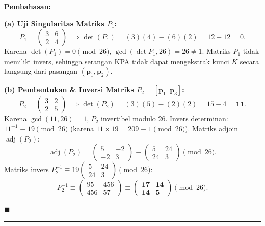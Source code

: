 \documentclass[11pt,a4paper]{article}
\newenvironment{solusi}{\noindent\textbf{\textsf{Pembahasan:}}\par\vspace{0.2em}}{\hfill$\blacksquare$\vspace{1em}\par\hrule\vspace{1em}}
\begin{document}
\begin{solusi}
\textbf{(a) Uji Singularitas Matriks $P_1$:}
\[
P_1 = \begin{pmatrix} 3 & 6 \\ 2 & 4 \end{pmatrix} \implies \det(P_1) = (3)(4) - (6)(2) = 12 - 12 = 0.
\]
Karena $\det(P_1) = 0 \pmod{26}$, $\gcd(\det P_1, 26) = 26 \ne 1$. Matriks $P_1$ tidak memiliki invers, sehingga serangan KPA tidak dapat mengekstrak kunci $K$ secara langsung dari pasangan $(\mathbf{p}_1, \mathbf{p}_2)$.

\vspace{0.2cm}
\textbf{(b) Pembentukan \& Inversi Matriks $P_2 = [\mathbf{p}_1 \;\; \mathbf{p}_3]$:}
\[
P_2 = \begin{pmatrix} 3 & 2 \\ 2 & 5 \end{pmatrix} \implies \det(P_2) = (3)(5) - (2)(2) = 15 - 4 = \mathbf{11}.
\]
Karena $\gcd(11, 26) = 1$, $P_2$ invertibel modulo 26.
Invers determinan: $11^{-1} \equiv 19 \pmod{26}$ (karena $11 \times 19 = 209 \equiv 1 \pmod{26}$).
Matriks adjoin $\operatorname{adj}(P_2)$:
\[
\operatorname{adj}(P_2) = \begin{pmatrix} 5 & -2 \\ -2 & 3 \end{pmatrix} \equiv \begin{pmatrix} 5 & 24 \\ 24 & 3 \end{pmatrix} \pmod{26}.
\]
Matriks invers $P_2^{-1} \equiv 19 \begin{pmatrix} 5 & 24 \\ 24 & 3 \end{pmatrix} \pmod{26}$:
\[
P_2^{-1} \equiv \begin{pmatrix} 95 & 456 \\ 456 & 57 \end{pmatrix} \equiv \mathbf{\begin{pmatrix} 17 & 14 \\ 14 & 5 \end{pmatrix}} \pmod{26}.
\]


\end{solusi}
\end{document}
